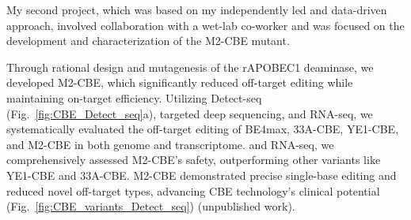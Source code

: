 \documentclass[12pt]{article}
\begin{document}
My second project, which was based on my independently led and data-driven approach,
involved collaboration with a wet-lab co-worker and was focused 
on the development and characterization of the M2-CBE mutant.

  
Through rational design and mutagenesis of the rAPOBEC1 deaminase, 
we developed M2-CBE, which significantly reduced off-target editing while maintaining on-target efficiency. 
Utilizing Detect-seq (Fig.~\ref{fig:CBE_Detect_seq}a), targeted deep sequencing, and RNA-seq, 
we systematically evaluated the off-target editing of BE4max, 33A-CBE, YE1-CBE, and M2-CBE in both genome and transcriptome.
and RNA-seq, we comprehensively assessed M2-CBE's safety, 
outperforming other variants like YE1-CBE and 33A-CBE\cite{doman2020evaluation}. 
M2-CBE demonstrated precise single-base editing and reduced novel off-target types, 
advancing CBE technology's clinical potential (Fig.~\ref{fig:CBE_variants_Detect_seq}) (unpublished work).
\end{document}

